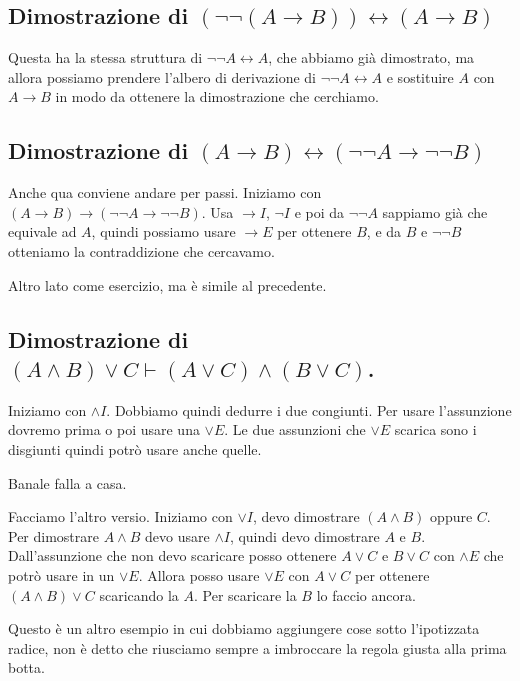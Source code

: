 \subsection{Dimostrazione di \((\neg \neg (A \to B)) \leftrightarrow (A \to B)\)}

Questa ha la stessa struttura di \(\neg \neg A \leftrightarrow A\), che abbiamo già dimostrato, ma allora possiamo prendere l'albero di derivazione di \(\neg \neg A \leftrightarrow A\) e sostituire \(A\) con \(A \to B\) in modo da ottenere la dimostrazione che cerchiamo.

\subsection*{Dimostrazione di \((A \to B) \leftrightarrow (\neg \neg A \to \neg \neg B)\)}

Anche qua conviene andare per passi. Iniziamo con \((A \to B) \to (\neg \neg A \to \neg \neg B)\). Usa \(\to I\), \(\neg I\) e poi da \(\neg \neg A\) sappiamo già che equivale ad \(A\), quindi possiamo usare \(\to E\) per ottenere \(B\), e da \(B\) e \(\neg \neg B\) otteniamo la contraddizione che cercavamo.

Altro lato come esercizio, ma è simile al precedente.

\subsection*{Dimostrazione di \((A \land B)\lor C \vdash (A \lor C) \land (B \lor C)\).}

Iniziamo con \(\land I\). Dobbiamo quindi dedurre i due congiunti. Per usare l'assunzione dovremo prima o poi usare una \(\lor E\). Le due assunzioni che \(\lor E\) scarica sono i disgiunti quindi potrò usare anche quelle.

Banale falla a casa.

Facciamo l'altro versio. Iniziamo con \(\lor I\), devo dimostrare \((A \land B)\) oppure \(C\). Per dimostrare \(A \land B\) devo usare \(\land I\), quindi devo dimostrare \(A\) e \(B\). Dall'assunzione che non devo scaricare posso ottenere \(A \lor C\) e \(B \lor C\) con \(\land E\) che potrò usare in un \(\lor E\). Allora posso usare \(\lor E\) con \(A \lor C\) per ottenere \((A \land B) \lor C\) scaricando la \(A\). Per scaricare la \(B\) lo faccio ancora.

Questo è un altro esempio in cui dobbiamo aggiungere cose sotto l'ipotizzata radice, non è detto che riusciamo sempre a imbroccare la regola giusta alla prima botta.

